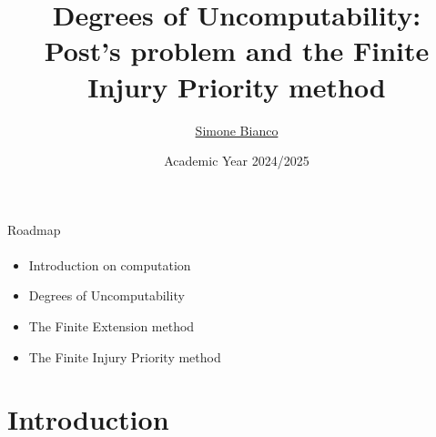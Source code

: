 \documentclass{beamer}
\title{Degrees of Uncomputability: \\Post's problem and the Finite \\Injury Priority method}
\author{\href{https://github.com/Exyss/}{Simone Bianco}}
\date{Academic Year 2024/2025}
\begin{document}
\maketitle








\begin{frame}{Roadmap}
\framesubtitle{\qquad}

    \begin{itemize}
    \item Introduction on computation
    \item Degrees of Uncomputability
    \item The Finite Extension method
    \item The Finite Injury Priority method
    \end{itemize}
\end{frame}

\section{Introduction}
\end{document}
